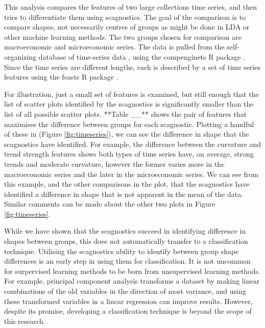 This analysis compares the features of two large collections time
series, and then tries to differentiate them using scagnostics. The goal
of the comparison is to compare shapes, not necessarily centres of
groups as might be done in LDA or other machine learning methods. The
two groups chosen for comparison are macroeconomic and microeconomic
series. The data is pulled from the self-organizing database of
time-series data \citep{sots}, using the compenginets R package
\citep{compenginets}. Since the time series are different lengths, each
is described by a set of time series features \citep[chapter 4
of][]{fpp} using the feasts R package \citep{feasts}.

For illustration, just a small set of features is examined, but still
enough that the list of scatter plots identified by the scagnostics is
significantly smaller than the list of all possible scatter plots.
**Table \_\_** shows the pair of features that maximises the difference
between groups for each scagnostic. Plotting a handful of these in
(Figure \ref{fig:timeseries}), we can see the difference in shape that
the scagnostics have identified. For example, the difference between the
curvature and trend strength features shows both types of time series
have, on average, strong trends and moderate curvature, however the
former varies more in the macroeconomic series and the later in the
microeconomic series. We can see from this example, and the other
comparisons in the plot, that the scagnostics have identified a
difference in shape that is not apparent in the mean of the data.
Similar comments can be made about the other two plots in Figure
\ref{fig:timeseries}.

While we have shown that the scagnostics succeed in identifying
difference in shapes between groups, this does not automatically
transfer to a classification technique. Utilising the scagnostics
ability to identify between group shape differences is an early step in
using them for classification. It is not uncommon for surpervised
learning methods to be born from unsupervised learning methods. For
example, principal component analysis transforms a dataset by making
linear combinations of the old variables in the direction of most
variance, and using these transformed variables in a linear regression
can improve results. However, despite its promise, developing a
classification technique is beyond the scope of this research.


